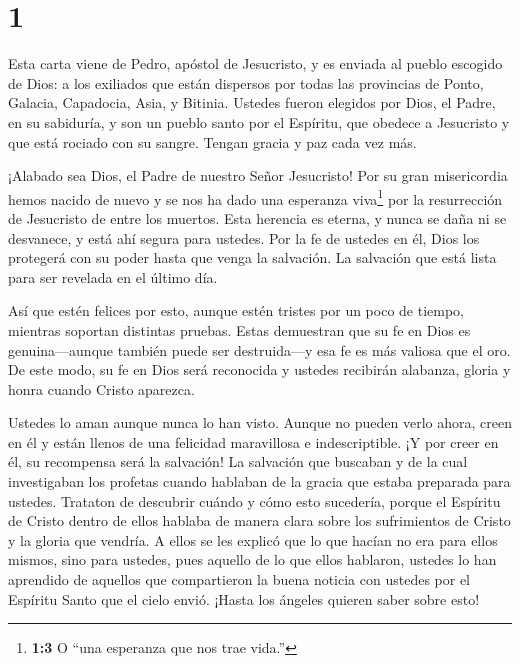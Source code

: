 \hypertarget{section}{%
\section{1}\label{section}}

 Esta carta viene de Pedro, apóstol de Jesucristo, y es
enviada al pueblo escogido de Dios: a los exiliados que están dispersos
por todas las provincias de Ponto, Galacia, Capadocia, Asia, y Bitinia.
 Ustedes fueron elegidos por Dios, el Padre, en su
sabiduría, y son un pueblo santo por el Espíritu, que obedece a
Jesucristo y que está rociado con su sangre. Tengan gracia y paz cada
vez más.

 ¡Alabado sea Dios, el Padre de nuestro Señor Jesucristo!
Por su gran misericordia hemos nacido de nuevo y se nos ha dado una
esperanza viva\footnote{\textbf{1:3} O ``una esperanza que nos trae
  vida.''} por la resurrección de Jesucristo de entre los muertos.
 Esta herencia es eterna, y nunca se daña ni se desvanece, y
está ahí segura para ustedes.  Por la fe de ustedes en él,
Dios los protegerá con su poder hasta que venga la salvación. La
salvación que está lista para ser revelada en el último día.

 Así que estén felices por esto, aunque estén tristes por un
poco de tiempo, mientras soportan distintas pruebas.  Estas
demuestran que su fe en Dios es genuina---aunque también puede ser
destruida---y esa fe es más valiosa que el oro. De este modo, su fe en
Dios será reconocida y ustedes recibirán alabanza, gloria y honra cuando
Cristo aparezca.

 Ustedes lo aman aunque nunca lo han visto. Aunque no pueden
verlo ahora, creen en él y están llenos de una felicidad maravillosa e
indescriptible.  ¡Y por creer en él, su recompensa será la
salvación!  La salvación que buscaban y de la cual
investigaban los profetas cuando hablaban de la gracia que estaba
preparada para ustedes.  Trataton de descubrir cuándo y
cómo esto sucedería, porque el Espíritu de Cristo dentro de ellos
hablaba de manera clara sobre los sufrimientos de Cristo y la gloria que
vendría.  A ellos se les explicó que lo que hacían no era
para ellos mismos, sino para ustedes, pues aquello de lo que ellos
hablaron, ustedes lo han aprendido de aquellos que compartieron la buena
noticia con ustedes por el Espíritu Santo que el cielo envió. ¡Hasta los
ángeles quieren saber sobre esto!

